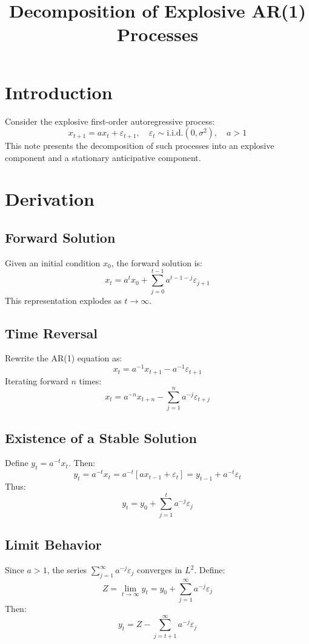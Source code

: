 \documentclass[12pt]{article}
\title{Decomposition of Explosive AR(1) Processes}
\author{}
\date{}
\begin{document}
\maketitle

\section{Introduction}
Consider the explosive first-order autoregressive process:
\[
x_{t+1} = a x_t + \varepsilon_{t+1}, \quad \varepsilon_t \sim \text{i.i.d.}(0, \sigma^2), \quad a > 1
\]
This note presents the decomposition of such processes into an explosive component and a stationary anticipative component.

\section{Derivation}

\subsection{Forward Solution}
Given an initial condition \( x_0 \), the forward solution is:
\[
x_t = a^t x_0 + \sum_{j=0}^{t-1} a^{t-1-j} \varepsilon_{j+1}
\]
This representation explodes as \( t \to \infty \).

\subsection{Time Reversal}
Rewrite the AR(1) equation as:
\[
x_t = a^{-1} x_{t+1} - a^{-1} \varepsilon_{t+1}
\]
Iterating forward \( n \) times:
\[
x_t = a^{-n} x_{t+n} - \sum_{j=1}^{n} a^{-j} \varepsilon_{t+j}
\]

\subsection{Existence of a Stable Solution}
Define \( y_t = a^{-t} x_t \). Then:
\[
y_t = a^{-t} x_t = a^{-t} [a x_{t-1} + \varepsilon_t] = y_{t-1} + a^{-t} \varepsilon_t
\]
Thus:
\[
y_t = y_0 + \sum_{j=1}^{t} a^{-j} \varepsilon_j
\]

\subsection{Limit Behavior}
Since \( a > 1 \), the series \( \sum_{j=1}^{\infty} a^{-j} \varepsilon_j \) converges in \( L^2 \). Define:
\[
Z = \lim_{t \to \infty} y_t = y_0 + \sum_{j=1}^{\infty} a^{-j} \varepsilon_j
\]
Then:
\[
y_t = Z - \sum_{j=t+1}^{\infty} a^{-j} \varepsilon_j
\]
\end{document}
